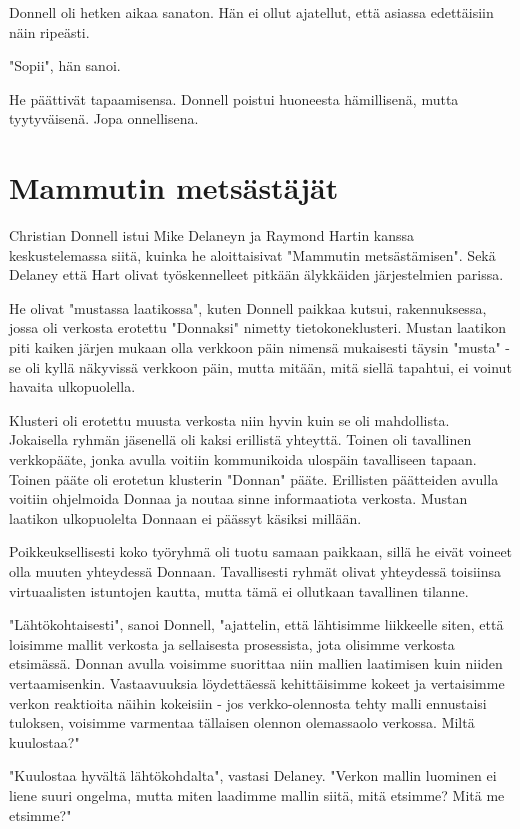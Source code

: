 Donnell oli hetken aikaa sanaton. Hän ei ollut ajatellut, että asiassa edettäisiin näin ripeästi.


"Sopii", hän sanoi.


He päättivät tapaamisensa. Donnell poistui huoneesta hämillisenä, mutta tyytyväisenä. Jopa onnellisena.






\chapter{Mammutin metsästäjät}Christian Donnell istui Mike Delaneyn ja Raymond Hartin kanssa keskustelemassa siitä, kuinka he aloittaisivat "Mammutin metsästämisen". Sekä Delaney että Hart olivat työskennelleet pitkään älykkäiden järjestelmien parissa.


He olivat "mustassa laatikossa", kuten Donnell paikkaa kutsui, rakennuksessa, jossa oli verkosta erotettu "Donnaksi" nimetty tietokoneklusteri. Mustan laatikon piti kaiken järjen mukaan olla verkkoon päin nimensä mukaisesti täysin "musta" - se oli kyllä näkyvissä verkkoon päin, mutta mitään, mitä siellä tapahtui, ei voinut havaita ulkopuolella.


Klusteri oli erotettu muusta verkosta niin hyvin kuin se oli mahdollista. Jokaisella ryhmän jäsenellä oli kaksi erillistä yhteyttä. Toinen oli tavallinen verkkopääte, jonka avulla voitiin kommunikoida ulospäin tavalliseen tapaan. Toinen pääte oli erotetun klusterin "Donnan" pääte. Erillisten päätteiden avulla voitiin ohjelmoida Donnaa ja noutaa sinne informaatiota verkosta. Mustan laatikon ulkopuolelta Donnaan ei päässyt käsiksi millään.


Poikkeuksellisesti koko työryhmä oli tuotu samaan paikkaan, sillä he eivät voineet olla muuten yhteydessä Donnaan. Tavallisesti ryhmät olivat yhteydessä toisiinsa virtuaalisten istuntojen kautta, mutta tämä ei ollutkaan tavallinen tilanne.


"Lähtökohtaisesti", sanoi Donnell, "ajattelin, että lähtisimme liikkeelle siten, että loisimme mallit verkosta ja sellaisesta prosessista, jota olisimme verkosta etsimässä. Donnan avulla voisimme suorittaa niin mallien laatimisen kuin niiden vertaamisenkin. Vastaavuuksia löydettäessä kehittäisimme kokeet ja vertaisimme verkon reaktioita näihin kokeisiin - jos verkko-olennosta tehty malli ennustaisi tuloksen, voisimme varmentaa tällaisen olennon olemassaolo verkossa. Miltä kuulostaa?"


"Kuulostaa hyvältä lähtökohdalta", vastasi Delaney. "Verkon mallin luominen ei liene suuri ongelma, mutta miten laadimme mallin siitä, mitä etsimme? Mitä me etsimme?"



